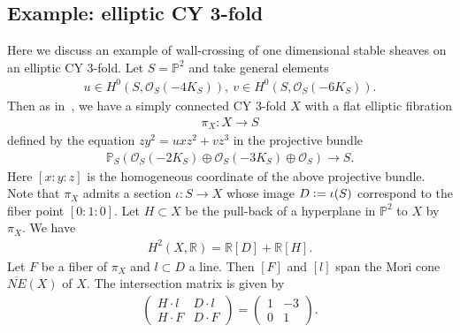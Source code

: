 \documentclass[11pt]{amsart}
\theoremstyle{plain}
\theoremstyle{definition}
\theoremstyle{remark}
\newcommand{\oO}{\mathcal{O}}
\begin{document}
\subsection{Example: elliptic CY 3-fold}\label{exam:elliptic}
Here we discuss
an example of 
 wall-crossing of one dimensional 
stable sheaves
on an elliptic CY 3-fold. 
Let $S=\mathbb{P}^2$ and take 
general elements 
\begin{align*}
u \in H^0(S, \oO_S(-4K_S)), \ 
v \in H^0(S, \oO_S(-6K_S)).
\end{align*}
Then as in~\cite[Section~6.4]{Tsurvey}, 
we have a simply connected CY 3-fold 
$X$ with a flat elliptic fibration
\begin{align}\label{pi:XS}
\pi_X \colon X \to S
\end{align}
defined by the equation 
$zy^2=uxz^2+vz^3$
in the projective bundle 
\begin{align*}
\mathbb{P}_S(\oO_S(-2K_S) \oplus \oO_S(-3K_S) \oplus \oO_S) \to S. 
\end{align*}
Here $[x:y:z]$ is the homogeneous coordinate
of the above projective bundle. 
Note that $\pi_X$ admits a section
$\iota \colon S \to X$
whose image $D \cneq \iota(S)$
correspond to the fiber point 
$[0:1:0]$. 
Let $H \subset X$ be 
the pull-back of a hyperplane in $\mathbb{P}^2$
to $X$ by $\pi_X$. We have
\begin{align*}
H^2(X, \mathbb{R})=\mathbb{R}[D]+\mathbb{R}[H].
\end{align*}
Let $F$ be a fiber of $\pi_X$ and 
$l \subset D$ a line. 
Then $[F]$ and $[l]$ span the Mori cone
$\overline{NE}(X)$ of $X$. 
The intersection matrix is given by
\begin{align*}
\left(\begin{array}{cc}
H \cdot l & D \cdot l \\
H \cdot F & D \cdot F
\end{array}  \right)
=\left(\begin{array}{cc}
1 & -3 \\
0 & 1
\end{array}  \right).
\end{align*}
\end{document}
